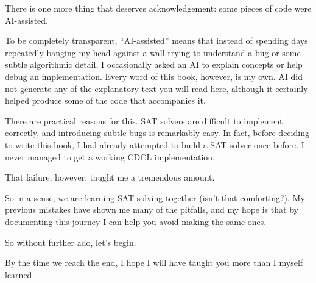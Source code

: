 There is one more thing that deserves acknowledgement: some pieces of code were AI-assisted.

To be completely transparent, ``AI-assisted'' means that instead of spending days repeatedly banging my head against a wall trying to understand a bug or some subtle algorithmic detail, I occasionally asked an AI to explain concepts or help debug an implementation. Every word of this book, however, is my own. AI did not generate any of the explanatory text you will read here, although it certainly helped produce some of the code that accompanies it.

There are practical reasons for this. SAT solvers are difficult to implement correctly, and introducing subtle bugs is remarkably easy. In fact, before deciding to write this book, I had already attempted to build a SAT solver once before. I never managed to get a working CDCL implementation.

That failure, however, taught me a tremendous amount.

So in a sense, we are learning SAT solving together (isn't that comforting?). My previous mistakes have shown me many of the pitfalls, and my hope is that by documenting this journey I can help you avoid making the same ones.

So without further ado, let's begin.

By the time we reach the end, I hope I will have taught you more than I myself learned.
